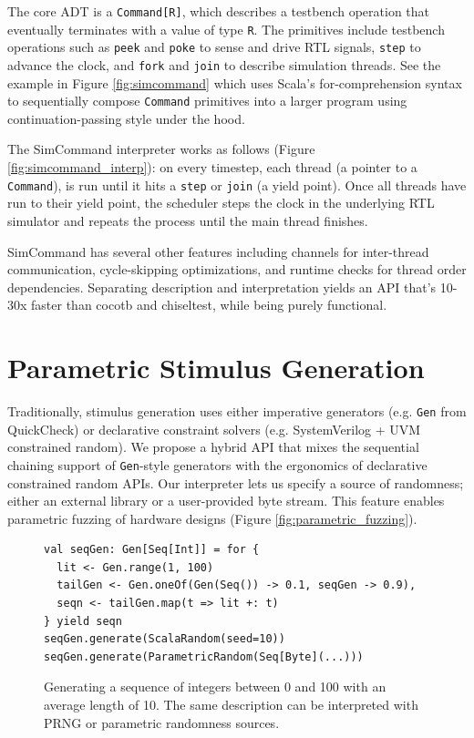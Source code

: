 \documentclass[sigplan,review,nonacm,9pt]{acmart}
\begin{document}
The core ADT is a \texttt{Command[R]}, which describes a testbench operation that eventually terminates with a value of type \texttt{R}.
The primitives include testbench operations such as \texttt{peek} and \texttt{poke} to sense and drive RTL signals, \texttt{step} to advance the clock, and \texttt{fork} and \texttt{join} to describe simulation threads.
See the example in Figure \ref{fig:simcommand} which uses Scala's for-comprehension syntax to sequentially compose \texttt{Command} primitives into a larger program using continuation-passing style under the hood.

The SimCommand interpreter works as follows (Figure \ref{fig:simcommand_interp}): on every timestep, each thread (a pointer to a \texttt{Command}), is run until it hits a \texttt{step} or \texttt{join} (a yield point).
Once all threads have run to their yield point, the scheduler steps the clock in the underlying RTL simulator and repeats the process until the main thread finishes.

SimCommand has several other features including channels for inter-thread communication, cycle-skipping optimizations, and runtime checks for thread order dependencies.
Separating description and interpretation yields an API that's 10-30x faster than cocotb and chiseltest, while being purely functional.


\section{Parametric Stimulus Generation}

Traditionally, stimulus generation uses either imperative generators (e.g. \texttt{Gen} from QuickCheck\cite{quickcheck}) or declarative constraint solvers (e.g. SystemVerilog + UVM constrained random\cite{riscv_dv}).
We propose a hybrid API that mixes the sequential chaining support of \texttt{Gen}-style generators with the ergonomics of declarative constrained random APIs.
Our interpreter lets us specify a source of randomness; either an external library or a user-provided byte stream.
This feature enables parametric fuzzing\cite{zest} of hardware designs (Figure \ref{fig:parametric_fuzzing}).

\begin{figure}
\begin{verbatim}
val seqGen: Gen[Seq[Int]] = for {
  lit <- Gen.range(1, 100)
  tailGen <- Gen.oneOf(Gen(Seq()) -> 0.1, seqGen -> 0.9),
  seqn <- tailGen.map(t => lit +: t)
} yield seqn
seqGen.generate(ScalaRandom(seed=10))
seqGen.generate(ParametricRandom(Seq[Byte](...)))
\end{verbatim}
\caption{Generating a sequence of integers between 0 and 100 with an average length of 10. The same description can be interpreted with PRNG or parametric randomness sources.}
\label{fig:randomapi}
\end{figure}
\end{document}
